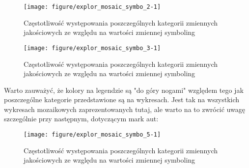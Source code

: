 \documentclass[12pt, a4paper]{article}\usepackage[]{graphicx}\usepackage[]{xcolor}
\makeatletter
\def\maxwidth{ %
  \ifdim\Gin@nat@width>\linewidth
    \linewidth
  \else
    \Gin@nat@width
  \fi
}
\newenvironment{knitrout}{}{} %
\makeatother
\begin{document}
\begin{knitrout}
\color{fgcolor}\begin{figure}[H]

{\centering \texttt{[image: figure/explor\_mosaic\_symbo\_2-1]} 

}

\caption[Częstotliwość występowania poszczególnych kategorii zmiennych jakościowych ze względu na wartości zmiennej symboling]{Częstotliwość występowania poszczególnych kategorii zmiennych jakościowych ze względu na wartości zmiennej symboling}\label{fig:explor_mosaic_symbo_2}
\end{figure}

\end{knitrout}


\begin{knitrout}
\color{fgcolor}\begin{figure}[H]

{\centering \texttt{[image: figure/explor\_mosaic\_symbo\_3-1]} 

}

\caption[Częstotliwość występowania poszczególnych kategorii zmiennych jakościowych ze względu na wartości zmiennej symboling]{Częstotliwość występowania poszczególnych kategorii zmiennych jakościowych ze względu na wartości zmiennej symboling}\label{fig:explor_mosaic_symbo_3}
\end{figure}

\end{knitrout}

Warto zauważyć, że kolory na legendzie są "do góry nogami" względem tego jak poszczególne kategorie przedstawione są na wykresach. Jest tak na wszystkich wykresach mozaikowych zaprezentowanych tutaj, ale warto na to zwrócić uwagę szczególnie przy następnym, dotyczącym mark aut: 
\begin{knitrout}
\color{fgcolor}\begin{figure}[H]

{\centering \texttt{[image: figure/explor\_mosaic\_symbo\_5-1]} 

}

\caption[Częstotliwość występowania poszczególnych kategorii zmiennych jakościowych ze względu na wartości zmiennej symboling]{Częstotliwość występowania poszczególnych kategorii zmiennych jakościowych ze względu na wartości zmiennej symboling}\label{fig:explor_mosaic_symbo_5}
\end{figure}

\end{knitrout}
\end{document}
